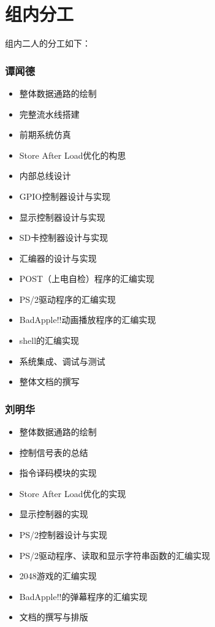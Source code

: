 \documentclass[11pt,utf8]{report}
\begin{document}
\section{组内分工}
组内二人的分工如下：
\begin{multicols}{2}
\subsubsection*{谭闻德}
\begin{itemize}
	\item 整体数据通路的绘制
	\item 完整流水线搭建
	\item 前期系统仿真
	\item Store After Load优化的构思
	\item 内部总线设计
	\item GPIO控制器设计与实现
	\item 显示控制器设计与实现
	\item SD卡控制器设计与实现
	\item 汇编器的设计与实现
	\item POST（上电自检）程序的汇编实现
	\item PS/2驱动程序的汇编实现
	\item BadApple!!动画播放程序的汇编实现
	\item shell的汇编实现
	\item 系统集成、调试与测试
	\item 整体文档的撰写
\end{itemize}
\columnbreak
\subsubsection*{刘明华}
\begin{itemize}
	\item 整体数据通路的绘制
	\item 控制信号表的总结
	\item 指令译码模块的实现
	\item Store After Load优化的实现
	\item 显示控制器的实现
	\item PS/2控制器设计与实现
	\item PS/2驱动程序、读取和显示字符串函数的汇编实现
	\item 2048游戏的汇编实现
	\item BadApple!!的弹幕程序的汇编实现
	\item 文档的撰写与排版
\end{itemize}
\end{multicols}
\end{document}
